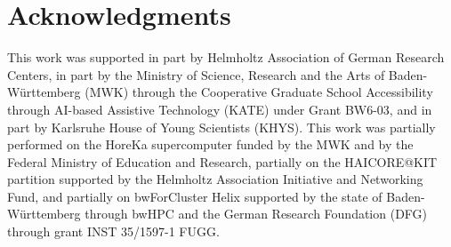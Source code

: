 \section*{Acknowledgments}

This work was supported in part by Helmholtz Association of German Research Centers, in part by the Ministry of Science, Research and the Arts of Baden-Württemberg (MWK) through the Cooperative Graduate School Accessibility through AI-based Assistive Technology (KATE) under Grant BW6-03, and in part by Karlsruhe House of Young Scientists (KHYS). This work was partially performed on the HoreKa supercomputer funded by the MWK and by the Federal Ministry of Education and Research, partially on the HAICORE@KIT partition supported by the Helmholtz Association Initiative and Networking Fund, and partially on bwForCluster Helix supported by the state of Baden-Württemberg through bwHPC and the German Research Foundation (DFG) through grant INST 35/1597-1 FUGG.
